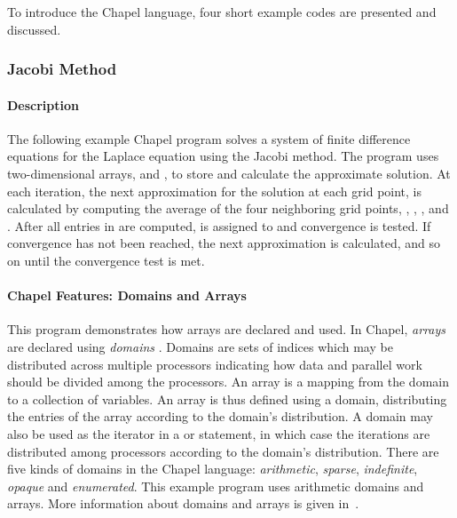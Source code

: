 To introduce the Chapel language, four short example codes are presented and
discussed.  

\subsubsection{Jacobi Method}

\paragraph{Description}
The following example Chapel program solves a system of finite difference
equations for the Laplace equation using the Jacobi method.  The program uses
two-dimensional arrays,  and , to store and calculate the approximate
solution.  At each iteration, the next approximation for the solution at 
each grid point,  is calculated by computing the average of 
the four neighboring grid points,
, , , and .  
After all entries in  are computed,  is assigned to 
and convergence is tested.  If convergence has not been reached, the next
approximation is calculated, and so on until the convergence test is met.

\paragraph{Chapel Features:  Domains and Arrays}
This program demonstrates how arrays are declared and used.  In Chapel, 
{\em arrays} are declared using {\em domains} .  
Domains are sets of indices which may be distributed
across multiple processors indicating how data and parallel work should
be divided among the processors.  An array is a mapping from the domain
to a collection of variables.  An array is thus defined using a domain, distributing
the entries of the array according to the domain's distribution.
A domain may also be used as the iterator in a  or
 statement, in which case the iterations are distributed among processors
according to the domain's distribution.  There are five kinds of domains in
the Chapel language:  {\em arithmetic}, {\em sparse}, {\em indefinite},
{\em opaque} and {\em enumerated}.  This example program uses arithmetic domains
and arrays.  More information about domains and arrays is given in~.

